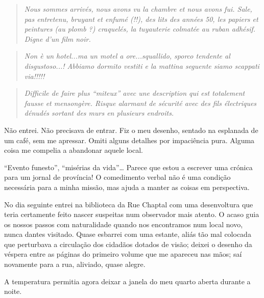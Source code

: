 \begin{quote}
\emph{Nous sommes arrivés, nous avons vu la chambre et nous avons fui.
Sale, pas entretenu, bruyant et enfumé (!!), des lits des années 50, les
papiers et peintures (au plomb ?) craquelés, la tuyauterie colmatée au
ruban adhésif. Digne d'un film noir.}
\end{quote}

\begin{quote}
\emph{Non è un hotel...ma un motel a ore...squallido, sporco tendente
al disgustoso...! Abbiamo dormito vestiti e la mattina seguente siamo
scappati via!!!!!}
\end{quote}

\begin{quote}
\emph{Difficile de faire plus ``miteux'' avec une description qui est
totalement fausse et mensongère. Risque alarmant de sécurité avec des
fils électriques dénudés sortant des murs en plusieurs endroits.}
\end{quote}

Não entrei. Não precisava de entrar. Fiz o meu desenho, sentado na
esplanada de um café, sem me apressar. Omiti alguns detalhes por
impaciência pura. Alguma coisa me compelia a abandonar aquele local.

``Evento funesto'', ``misérias da vida''\ldots{} Parece que estou a
escrever uma crónica para um jornal de província! O comedimento verbal
não é uma condição necessária para a minha missão, mas ajuda a manter as
coisas em perspectiva.

No dia seguinte entrei na biblioteca da Rue Chaptal com uma desenvoltura
que teria certamente feito nascer suspeitas num observador mais atento.
O acaso guia os nossos passos com naturalidade quando nos encontramos
num local novo, nunca dantes visitado. Quase esbarrei com uma estante,
aliás
tão mal colocada que perturbava a circulação dos cidadãos dotados de
visão; deixei o desenho da véspera entre as páginas do primeiro volume
que me apareceu nas mãos; saí novamente para a rua, aliviado, quase
alegre.

A temperatura permitia agora deixar a janela do meu quarto aberta
durante a noite.

